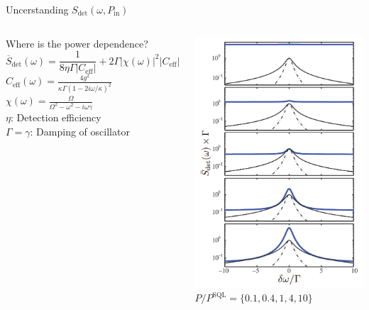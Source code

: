 \documentclass{beamer}
\begin{document}
\begin{frame}{Uncerstanding $S_\text{det}(\omega, P_\text{in})$}
	\begin{columns}
		Where is the power dependence?
		$$
		\overline S_\text{det}(\omega)
		= \frac{1}{8 \eta \Gamma |C_\text{eff}|}
		+ 2 \Gamma |\chi(\omega)|^2 |C_\text{eff}|
		$$
		$C_\text{eff}(\omega) = \frac{4 g^2}{\kappa \Gamma(1-2 i\omega /\kappa)^2}$\\
		$\chi(\omega) = \frac{\Omega}{\Omega^2 - \omega^2 - i\omega\gamma}$ \\
		$\eta$: Detection efficiency\\
		$\Gamma = \gamma$: Damping of oscillator\\
		

		\small\centering
		\includegraphics[width=\textwidth]{figures/3.5.png}
		$P/P^\text{SQL} = \{0.1, 0.4, 1, 4, 10\}$

	\end{columns}
\end{frame}


{
	\begin{frame}[plain]{}\end{frame}
}
\end{document}
